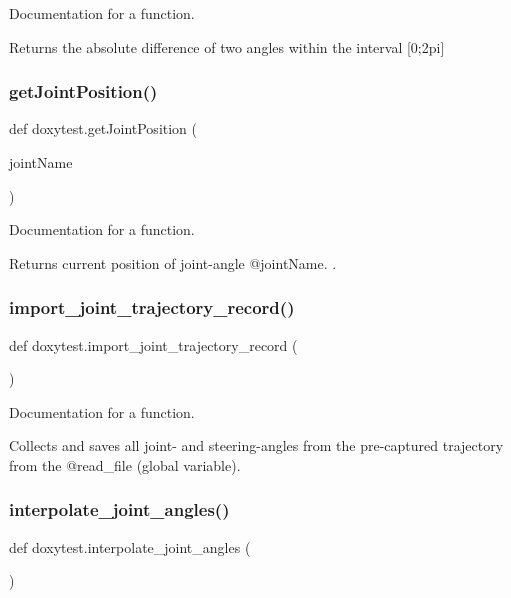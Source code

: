 Documentation for a function. 

Returns the absolute difference of two angles within the interval \mbox{[}0;2pi\mbox{]} \mbox{\label{namespacedoxytest_a39717765a109cab21b95b48231355036}} 
\subsubsection{\texorpdfstring{getJointPosition()}{getJointPosition()}}
{\footnotesize\ttfamily def doxytest.\+get\+Joint\+Position (\begin{DoxyParamCaption}\item[{}]{joint\+Name }\end{DoxyParamCaption})}



Documentation for a function. 

Returns current position of joint-\/angle @joint\+Name. . \mbox{\label{namespacedoxytest_a40d30f7062fff4fa63ea4d99c3fdef46}} 
\subsubsection{\texorpdfstring{import\_joint\_trajectory\_record()}{import\_joint\_trajectory\_record()}}
{\footnotesize\ttfamily def doxytest.\+import\+\_\+joint\+\_\+trajectory\+\_\+record (\begin{DoxyParamCaption}{ }\end{DoxyParamCaption})}



Documentation for a function. 

Collects and saves all joint-\/ and steering-\/angles from the pre-\/captured trajectory from the @read\+\_\+file (global variable). \mbox{\label{namespacedoxytest_a5fedae7205b3914d4d4321e795c66c5e}} 
\subsubsection{\texorpdfstring{interpolate\_joint\_angles()}{interpolate\_joint\_angles()}}
{\footnotesize\ttfamily def doxytest.\+interpolate\+\_\+joint\+\_\+angles (\begin{DoxyParamCaption}{ }\end{DoxyParamCaption})}



